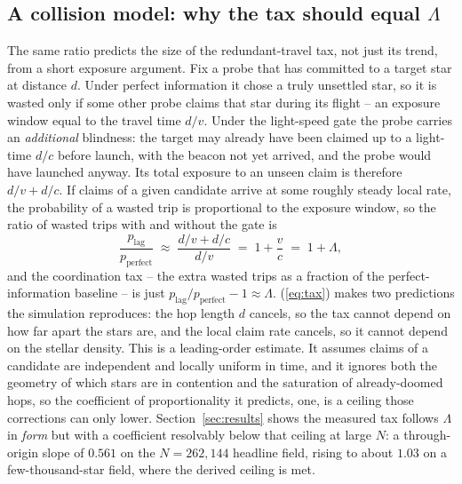 \subsection{A collision model: why the tax should equal $\Lambda$}
\label{sec:theory}
The same ratio predicts the size of the redundant-travel tax, not just its trend, from a short
exposure argument. Fix a probe that has committed to a target star at distance $d$. Under perfect
information it chose a truly unsettled star, so it is wasted only if some other probe claims that
star during its flight -- an exposure window equal to the travel time $d/v$. Under the light-speed
gate the probe carries an \emph{additional} blindness: the target may already have been claimed up
to a light-time $d/c$ before launch, with the beacon not yet arrived, and the probe would have
launched anyway. Its total exposure to an unseen claim is therefore $d/v + d/c$. If claims of a
given candidate arrive at some roughly steady local rate, the probability of a wasted trip is
proportional to the exposure window, so the ratio of wasted trips with and without the gate is
\begin{equation}
\frac{p_{\text{lag}}}{p_{\text{perfect}}} \;\approx\; \frac{d/v + d/c}{d/v} \;=\; 1 + \frac{v}{c}
\;=\; 1 + \Lambda,
\label{eq:tax}
\end{equation}
and the coordination tax -- the extra wasted trips as a fraction of the perfect-information
baseline -- is just $p_{\text{lag}}/p_{\text{perfect}} - 1 \approx \Lambda$. (\ref{eq:tax}) makes two predictions the simulation reproduces: the hop
length $d$ cancels, so the tax cannot depend on how far apart the stars are, and the local claim
rate cancels, so it cannot depend on the stellar density. This is a leading-order estimate. It
assumes claims of a candidate are independent and locally uniform in time, and it ignores both the
geometry of which stars are in contention and the saturation of already-doomed hops, so the
coefficient of proportionality it predicts, one, is a ceiling those corrections can only lower.
Section~\ref{sec:results} shows the measured tax follows $\Lambda$ in \emph{form} but with a
coefficient resolvably below that ceiling at large $N$: a through-origin slope of $0.561$ on the
$N = 262{,}144$ headline field, rising to about $1.03$ on a few-thousand-star field, where the
derived ceiling is met.

